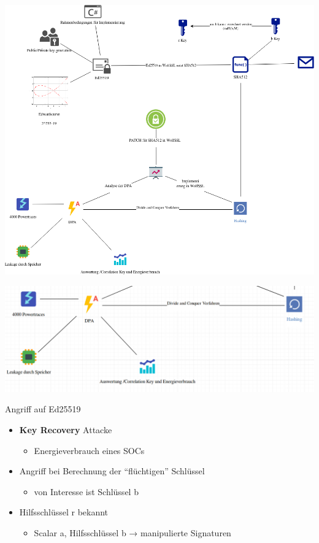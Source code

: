 \documentclass[
  10pt,
  ignorenonframetext,
  aspectratio=169,
]{beamer}
\providecommand{\tightlist}{%
  \setlength{\itemsep}{0pt}\setlength{\parskip}{0pt}}
\begin{document}
\begin{frame}{}
\protect\hypertarget{section-21}{}
\includegraphics{Abbildungen/ITSEC(1).png}
\end{frame}

\begin{frame}{}
\protect\hypertarget{section-22}{}
\includegraphics{Abbildungen/Punkt4.png}
\end{frame}

\begin{frame}{Angriff auf Ed25519}
\protect\hypertarget{angriff-auf-ed25519}{}
\begin{itemize}
\tightlist
\item
  \textbf{Key Recovery} Attacke

  \begin{itemize}
  \tightlist
  \item
    Energieverbrauch eines SOCs
  \end{itemize}
\item
  Angriff bei Berechnung der ``flüchtigen'' Schlüssel

  \begin{itemize}
  \tightlist
  \item
    von Interesse ist Schlüssel b
  \end{itemize}
\item
  Hilfsschlüssel r bekannt

  \begin{itemize}
  \tightlist
  \item
    Scalar a, Hilfsschlüssel b → manipulierte Signaturen
  \end{itemize}
\end{itemize}
\end{frame}
\end{document}
